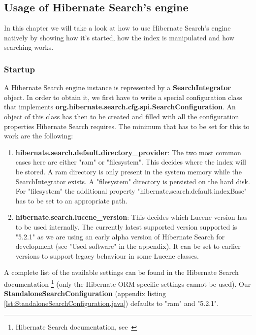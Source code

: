 \pagebreak

\subsection{Usage of Hibernate Search's engine} \label{using_hsearch_engine}
In this chapter we will take a look at how to use Hibernate Search's engine natively by showing how it's started, how the index is manipulated and how searching works.

\subsubsection{Startup}
A Hibernate Search engine instance is represented by a \textbf{SearchIntegrator} object. In order to obtain it, we first have to write a special configuration class that implements \textbf{org.hibernate.search.cfg.spi.SearchConfiguration}. An object of this class has then to be created and filled with all the configuration properties Hibernate Search requires. The minimum that has to be set for this to work are the following:

\begin{enumerate}
	\item \textbf{hibernate.search.default.directory\_provider}: The two most common cases here are either "ram" or "filesystem". This decides where the index will be stored. A ram directory is only present in the system memory while the SearchIntegrator exists. A "filesystem" directory is persisted on the hard disk. For "filesystem" the additional property "hibernate.search.default.indexBase" has to be set to an appropriate path.
	
	\item \textbf{hibernate.search.lucene\_version}: This decides which Lucene version has to be used internally. The currently latest supported version supported is "5.2.1" as we are using an early alpha version of Hibernate Search for development (see "Used software" in the appendix). It can be set to earlier versions to support legacy behaviour in some Lucene classes.
\end{enumerate}
\noindent
A complete list of the available settings can be found in the Hibernate Search documentation \footnote{Hibernate Search documentation, see~\cite{hibernate_search_doc}} (only the Hibernate ORM specific settings cannot be used). Our \textbf{StandaloneSearchConfiguration} (appendix listing \ref{lst:StandaloneSearchConfiguration.java}) defaults to "ram" and "5.2.1".

